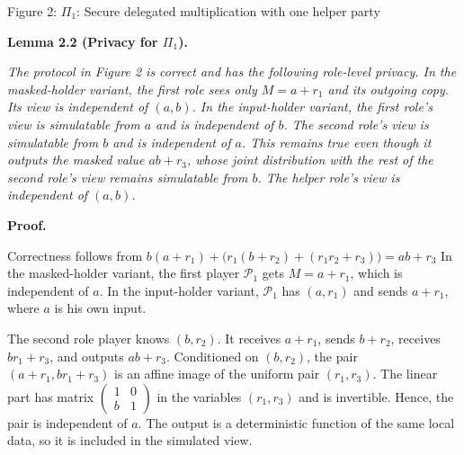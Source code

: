 \documentclass[10pt,a4paper]{article}
\begin{document}
Figure 2: $\Pi_{1}$: Secure delegated multiplication with one helper party




\par\medskip\noindent\textbf{
\textbf{Lemma 2.2}\textbf{ }(Privacy for $\Pi_{1}$)\textbf{.}
}\par



\emph{The protocol in Figure 2 is correct and has the following role-level privacy. In the masked-holder variant, the first role sees only $M=a+r_{1}$ and its outgoing copy. Its view is independent of $(a,b)$. In the input-holder variant, the first role’s view is simulatable from $a$ and is independent of $b$. The second role’s view is simulatable from $b$ and is independent of $a$. This remains true even though it outputs the masked value $ab+r_{3}$, whose joint distribution with the rest of the second role’s view remains simulatable from $b$. The helper role’s view is independent of $(a,b)$.}\par






\par\medskip\noindent\textbf{Proof.}\par




Correctness follows from
$b(a+r_{1})+\bigl(r_{1}(b+r_{2})+(r_{1}r_{2}+r_{3})\bigr)=ab+r_{3}$
In the masked-holder variant, the first player $\mathcal{P}_{1}$ gets $M=a+r_{1}$, which is independent of $a$.
In the input-holder variant, $\mathcal{P}_{1}$ has $(a,r_{1})$ and sends $a+r_{1}$, where $a$ is his own input.\par




The second role player knows $(b,r_{2})$. It receives $a+r_{1}$, sends $b+r_{2}$, receives $br_{1}+r_{3}$, and outputs $ab+r_{3}$. Conditioned on $(b,r_{2})$, the pair $(a+r_{1},br_{1}+r_{3})$ is an affine image of the uniform pair $(r_{1},r_{3})$. The linear part has matrix $\begin{pmatrix}1&0\\
b&1\end{pmatrix}$ in the variables $(r_{1},r_{3})$ and is invertible. Hence, the pair is independent of $a$. The output is a deterministic function of the same local data, so it is included in the simulated view.\par
\end{document}

